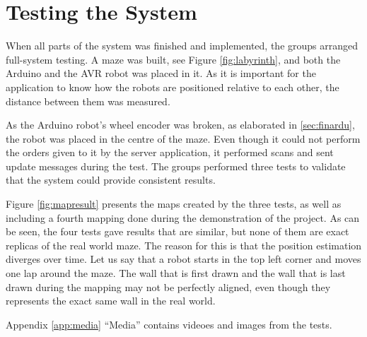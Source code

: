 \chapter{Testing the System}
When all parts of the system was finished and implemented, the groups arranged full-system testing. A maze was built, see Figure \ref{fig:labyrinth}, and both the Arduino and the AVR robot was placed in it. As it is important for the application to know how the robots are positioned relative to each other, the distance between them was measured.


As the Arduino robot's wheel encoder was broken, as elaborated in \ref{sec:finardu}, the robot was placed in the centre of the maze. Even though it could not perform the orders given to it by the server application, it performed scans and sent update messages during the test. The groups performed three tests to validate that the system could provide consistent results.

Figure \ref{fig:mapresult} presents the maps created by the three tests, as well as including a fourth mapping done during the demonstration of the project. As can be seen, the four tests gave results that are similar, but none of them are exact replicas of the real world maze. The reason for this is that the position estimation diverges over time. Let us say that a robot starts in the top left corner and moves one lap around the maze. The wall that is first drawn and the wall that is last drawn during the mapping may not be perfectly aligned, even though they represents the exact same wall in the real world.

Appendix \ref{app:media} ``Media'' contains videoes and images from the tests.

